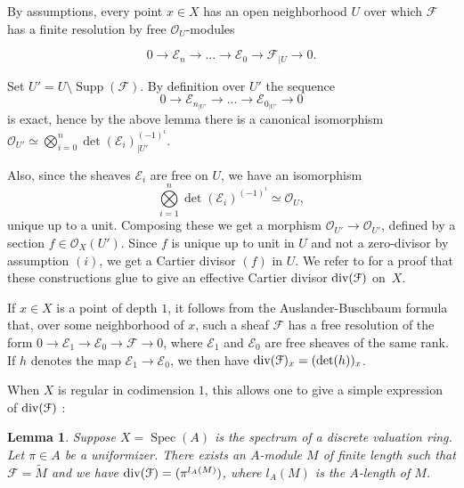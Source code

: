 \documentclass{amsart}
\newtheorem{lemm}{Lemma}[section]
\theoremstyle{definition}
\theoremstyle{remark}
\begin{document}
By assumptions, every point $x \in X$ has an open neighborhood $U$ over which ${{\mathcal F}}$ has a finite resolution by free ${{\mathcal O}}_U$-modules

\[0 {\longrightarrow} {{\mathcal E}}_n {\longrightarrow} ... {\longrightarrow} {{\mathcal E}}_0 {\longrightarrow} {{\mathcal F}}_{\vert U} {\longrightarrow} 0. \]

Set $U' = U \setminus \operatorname{Supp}({{\mathcal F}})$. By definition over $U'$ the sequence \[ 0 {\longrightarrow} {{\mathcal E}}_{n_{\vert U'}} {\longrightarrow} ... {\longrightarrow} {{\mathcal E}}_{0_{\vert U'}} {\longrightarrow} 0 \] is exact, hence by the above lemma there is a canonical isomorphism ${{\mathcal O}}_{U'} \simeq \displaystyle\bigotimes\limits_{i=0}^n \det({{\mathcal E}}_i)_{|U'}^{(-1)^i}$.

Also, since the sheaves ${{\mathcal E}}_i$ are free on $U$, we have an isomorphism \[\displaystyle\bigotimes\limits_{i=1}^n \det({{\mathcal E}}_i)^{(-1)^i} \simeq {{\mathcal O}}_U,\] unique up to a unit. Composing these we get a morphism ${{\mathcal O}}_{U'} {\longrightarrow} {{\mathcal O}}_{U'}$, defined by a section $f \in {{\mathcal O}}_X(U')$. Since $f$ is unique up to unit in $U$ and not a zero-divisor by assumption $(i)$, we get a Cartier divisor $(f)$ in $U$. We refer to \cite[Chap. V.3]{GIT} for a proof that these constructions glue to give an effective Cartier divisor $\textup{div}({{\mathcal F}})$ on~$X$. 

\medskip

If $x \in X$ is a point of depth $1$, it follows from the Auslander-Buschbaum formula that, over some neighborhood of $x$,  such a sheaf ${{\mathcal F}}$ has a free resolution of the form $0 {\longrightarrow} {{\mathcal E}}_1 {\longrightarrow} {{\mathcal E}}_0 {\longrightarrow} {{\mathcal F}} {\longrightarrow} 0$, where ${{\mathcal E}}_1$ and ${{\mathcal E}}_0$ are free sheaves of the same rank. If $h$ denotes the map ${{\mathcal E}}_1 {\longrightarrow} {{\mathcal E}}_0$, we then have $\textup{div}({{\mathcal F}})_x = (\det(h))_x$.

When $X$ is regular in codimension $1$, this allows one to give a simple expression of $\textup{div}({{\mathcal F}})$ : 

\begin{lemm}

Suppose $X = \operatorname{Spec}(A)$ is the spectrum of a discrete valuation ring. Let $\pi \in A$ be a uniformizer. There exists an $A$-module $M$ of finite length such that ${{\mathcal F}} = \tilde{M}$ and we have $\textup{div}({{\mathcal F}}) = (\pi^{l_A(M)})$, where $l_A(M)$ is the $A$-length of $M$. 

\end{lemm}
\end{document}
